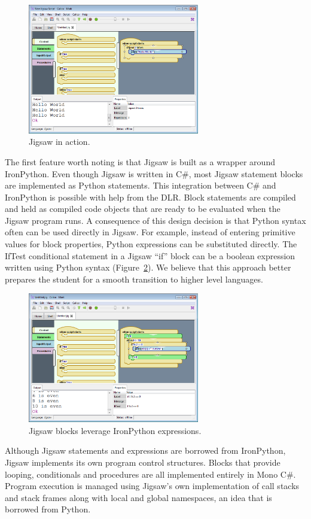 \documentclass[preprint]{sigplanconf}
\begin{document}
\begin{figure}[h!]
  \centering
     \includegraphics[width=75mm]{jigsaw1.eps}
  \caption{Jigsaw in action.}
  \label{jigsaw1}
\end{figure}

The first feature worth noting is that Jigsaw is built as a
wrapper around IronPython. Even though Jigsaw is written in C\#, most
Jigsaw statement blocks are implemented as Python statements. This
integration between C\# and IronPython is possible with help from the
DLR. Block statements are compiled and held as compiled code objects
that are ready to be evaluated when the Jigsaw program runs. A
consequence of this design decision is that Python syntax often can be
used directly in Jigsaw. For example, instead of entering primitive
values for block properties, Python expressions can be substituted
directly. The IfTest conditional statement in a Jigsaw ``if'' block can be a
boolean expression written using Python syntax (Figure~\ref{jigsaw2}). We believe
that this approach better prepares the student for a smooth transition
to higher level languages.

\begin{figure}[h!]
  \centering
    \includegraphics[width=75mm]{jigsaw2.eps} 
  \caption{Jigsaw blocks leverage IronPython expressions.}
  \label{jigsaw2}
\end{figure}

Although Jigsaw statements and expressions are borrowed from
IronPython, Jigsaw implements its own program control
structures. Blocks that provide looping, conditionals and procedures
are all implemented entirely in Mono C\#. Program execution is managed
using Jigsaw's own implementation of call stacks and stack frames
along with local and global namespaces, an idea that is borrowed from
Python.
\end{document}
